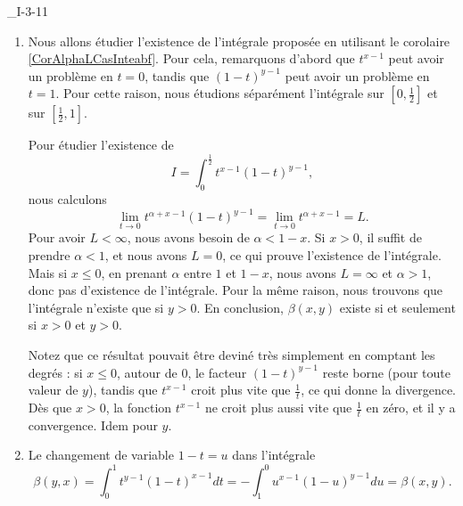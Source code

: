 

\begin{corrige}{_I-3-11}

\begin{enumerate}
\item 

Nous allons étudier l'existence de l'intégrale proposée en utilisant le corolaire \ref{CorAlphaLCasInteabf}. Pour cela, remarquons d'abord que $t^{x-1}$ peut avoir un problème en $t=0$, tandis que $(1-t)^{y-1}$ peut avoir un problème en $t=1$. Pour cette raison, nous étudions séparément l'intégrale sur $[0,\frac{ 1 }{2}]$ et sur $[\frac{ 1 }{2},1]$.

Pour étudier l'existence de 
\begin{equation}
	I=\int_0^{\frac{ 1 }{2}}t^{x-1}(1-t)^{y-1},
\end{equation}
nous calculons
\begin{equation}
	\lim_{t\to0}t^{\alpha+x-1}(1-t)^{y-1}=\lim_{t\to 0}t^{\alpha+x-1}=L.
\end{equation}
Pour avoir $L<\infty$, nous avons besoin de $\alpha<1-x$. Si $x>0$, il suffit de prendre $\alpha<1$, et nous avons $L=0$, ce qui prouve l'existence de l'intégrale. Mais si $x\leq 0$, en prenant $\alpha$ entre $1$ et $1-x$, nous avons $L=\infty$ et $\alpha>1$, donc pas d'existence de l'intégrale. Pour la même raison, nous trouvons que l'intégrale n'existe que si $y>0$. En conclusion, $\beta(x,y)$ existe si et seulement si $x>0$ et $y>0$. 

Notez que ce résultat pouvait être deviné très simplement en comptant les degrés : si $x\leq 0$, autour de $0$, le facteur $(1-t)^{y-1}$ reste borne (pour toute valeur de $y$), tandis que $t^{x-1}$ croit plus vite que $\frac{1}{ t }$, ce qui donne la divergence. Dès que $x>0$, la fonction $t^{x-1}$ ne croit plus aussi vite que $\frac{1}{ t }$ en zéro, et il y a convergence. Idem pour $y$.

\item
Le changement de variable $1-t=u$ dans l'intégrale
\begin{equation}
	\beta(y,x)=\int_0^1t^{y-1}(1-t)^{x-1}dt=-\int_1^0u^{x-1}(1-u)^{y-1}du=\beta(x,y).
\end{equation}


\end{enumerate}
\end{corrige}
